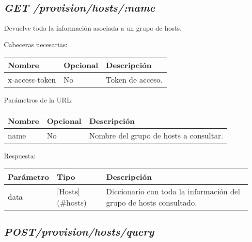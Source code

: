 \subsection{\textit{GET /provision/hosts/:name}}

Devuelve toda la información asociada a un grupo de hosts.

Cabeceras necesarias:

\begin{table}[h!]
	\centering
	\begin{adjustbox}{max width=\textwidth}
	\begin{tabular}{|l|l|l|}
		\hline
		Nombre & Opcional & Descripción \\ \hline
		x-access-token & No & Token de acceso. \\ \hline
	\end{tabular}
\end{adjustbox}
\end{table}

Parámetros de la URL:

\begin{table}[h!]
	\centering
	\begin{adjustbox}{max width=\textwidth}
	\begin{tabular}{|l|l|l|}
		\hline
		Nombre & Opcional & Descripción \\ \hline
		name & No & Nombre del grupo de hosts a consultar. \\ \hline
	\end{tabular}
\end{adjustbox}
\end{table}

Respuesta:

\begin{table}[h!]
	\centering
	\begin{adjustbox}{max width=\textwidth}
	\begin{tabular}{|l|l|l|}
		\hline
		Parámetro & Tipo & Descripción \\ \hline
		data & [Hosts](\#hosts) & Diccionario con toda la información del grupo de hosts consultado. \\ \hline
	\end{tabular}
\end{adjustbox}
\end{table}



\subsection{\textit{POST/provision/hosts/query}}

